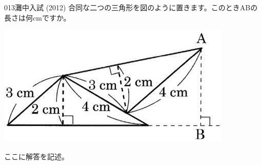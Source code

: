 \begin{thm}{013}{}{灘中入試 (2012)}
 合同な二つの三角形を図のように置きます。このときABの長さは何cmですか。
 \begin{center}
  \includegraphics[width=0.6\linewidth]{../problems/Q_013/Q_013.jpg}
 \end{center}
\end{thm}

ここに解答を記述。